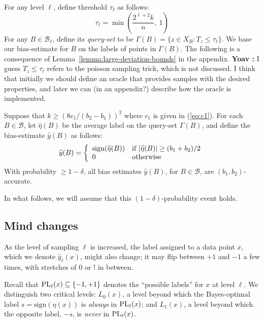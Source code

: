 \documentclass[anon,12pt]{colt2022} %
\def\B{{\mathcal B}}
\def\yh{{\widehat{y}}}
\def\sign{{\rm sign}}
\def\PL{{\mbox{\rm PL}}}
\newcommand{\comment}[3]{{\color{#1} {\bf #2 :} #3}}
\newcommand{\yoav}[1]{\comment{blue}{Yoav}{#1}}
\begin{document}
For any level $\ell$, define threshold $\tau_\ell$ as follows:
\begin{equation}
\tau_\ell = \min \left( \frac{2^{\ell+2}k}{n}, \ 1 \right)
\label{eq:threshold-ell}
\end{equation}
For any $B \in \B_\ell$, define its \emph{query-set} to be $\Gamma(B)
= \{z \in X_B: T_z \leq \tau_\ell\}$. We base our bias-estimate for
$B$ on the labels of points in $\Gamma(B)$. The following is a
consequence of Lemma~\ref{lemma:large-deviation-bounds} in the
appendix.
\yoav{I guess $T_z \leq \tau_\ell$ refers to the poisson sampling
  trick, which is not discussed. I think that initially we should
  define an oracle that provides samples with the desired properties,
  and later we can (in an appendix?) describe how the oracle is implemented.}
\begin{theorem}
Suppose that $k \geq (8c_1/(b_2-b_1))^2$ where $c_1$ is given in (\ref{eq:c1}). 
For each $B \in \B$, let $\widehat{\eta}(B)$ be the average label on the query-set $\Gamma(B)$, and define the bias-estimate $\yh(B)$ as follows:
$$ \yh(B)
= 
\left\{
\begin{array}{ll}
\sign(\widehat{\eta}(B)) & \mbox{if $|\widehat{\eta}(B)| \geq (b_1 + b_2)/2$} \\
0 & \mbox{otherwise}
\end{array}
\right.
$$
With probability $\geq 1-\delta$, all bias estimates $\yh(B)$, for $B \in \B$, are $(b_1,b_2)$-accurate.
\label{thm:accurate-bias-estimates}
\end{theorem}
In what follows, we will assume that this $(1-\delta)$-probability event holds.

\subsection{Mind changes}

As the level of sampling $\ell$ is increased, the label assigned to a data point $x$, which we denote $\yh_\ell(x)$, might also change; it may flip between $+1$ and $-1$ a few times, with stretches of $0$ or $!$ in between.

Recall that $\PL_\ell(x) \subseteq \{-1,+1\}$ denotes the ``possible labels'' for $x$ at level $\ell$. We distinguish two critical levels: $L_0(x)$, a level beyond which the Bayes-optimal label $s = \mbox{sign}(\eta(x))$ is \emph{always} in $\PL_\ell(x)$; and $L_1(x)$, a level beyond which the opposite label, $-s$, is \emph{never} in $\PL_\ell(x)$.

\end{document}
